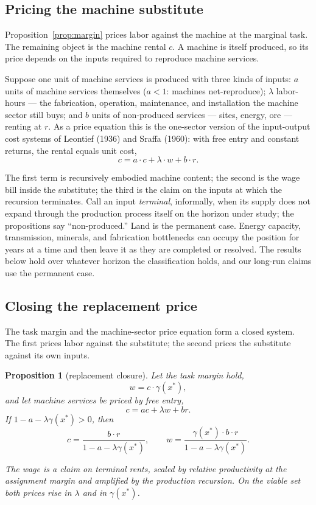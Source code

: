 \documentclass[12pt]{article}
\theoremstyle{plain}
\newtheorem{proposition}{Proposition}
\begin{document}
\subsection{Pricing the machine substitute}

Proposition~\ref{prop:margin} prices labor against the machine at the marginal
task. The remaining object is the machine rental $c$. A machine is itself
produced, so its price depends on the inputs required to reproduce machine
services.

Suppose one unit of machine services is produced with three kinds of inputs:
$a$ units of machine services themselves ($a<1$: machines net-reproduce);
$\lambda$ labor-hours --- the fabrication, operation, maintenance, and
installation the machine sector still buys; and $b$ units of non-produced
services --- sites, energy, ore --- renting at $r$. As a price equation this is
the one-sector version of the input-output cost systems of Leontief (1936) and
Sraffa (1960): with free entry and constant returns, the rental equals unit cost,
\begin{equation}\label{eq:recursion}
c = a\cdot c + \lambda\cdot w + b\cdot r.
\end{equation}

The first term is recursively embodied machine content; the second is the wage
bill inside the substitute; the third is the claim on the inputs at which the
recursion terminates. Call an input \emph{terminal}, informally, when its supply
does not expand through the production process itself on the horizon under
study; the propositions say ``non-produced.'' Land is the permanent case.
Energy capacity, transmission, minerals, and fabrication bottlenecks can occupy
the position for years at a time and then leave it as they are completed or
resolved. The results below hold over whatever horizon the classification holds,
and our long-run claims use the permanent case.


\subsection{Closing the replacement price}

The task margin and the machine-sector price equation form a closed system. The
first prices labor against the substitute; the second prices the substitute
against its own inputs.

\begin{proposition}[replacement closure]\label{prop:replacement}
Let the task margin hold,
\[
w = c\cdot\gamma(x^*),
\]
and let machine services be priced by free entry,
\[
c = ac + \lambda w + br.
\]
If $1-a-\lambda\gamma(x^*)>0$, then
\begin{equation}\label{eq:closure}
c =
\frac{b\cdot r}{1-a-\lambda\gamma(x^*)},
\qquad
w =
\frac{\gamma(x^*)\cdot b\cdot r}
     {1-a-\lambda\gamma(x^*)}.
\end{equation}

The wage is a claim on terminal rents, scaled by relative productivity at the
assignment margin and amplified by the production recursion. On the viable set
both prices rise in $\lambda$ and in $\gamma(x^*)$.
\end{proposition}
\end{document}
